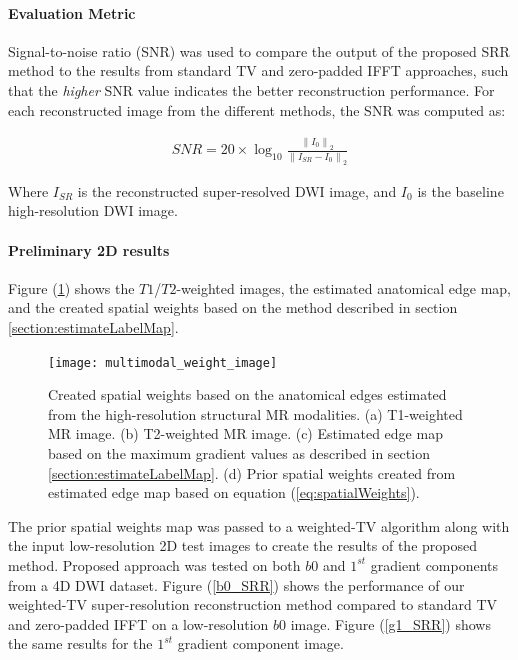 \paragraph{Evaluation Metric}

Signal-to-noise ratio (SNR) was used to compare the output of the proposed SRR method to the results from standard TV and zero-padded IFFT approaches, such that the \textit{higher} SNR value indicates the better reconstruction performance.
For each reconstructed image from the different methods, the SNR was computed as:

\begin{equation}
\label{eq:snr}
\begin{gathered}
SNR = 20\times \log_{10} \frac{\left \| I_0 \right \|_{2}}{\left \| I_{SR} - I_0 \right \|_{2}}
\end{gathered}
\end{equation}

Where $I_{SR}$ is the reconstructed super-resolved DWI image, and $I_0$ is the baseline high-resolution DWI image.

\paragraph{Preliminary 2D results}
Figure (\ref{multimodal_wight_image}) shows the $T1$/$T2$-weighted images, the estimated anatomical edge map, and the created spatial weights based on the method described in section \ref{section:estimateLabelMap}.

\begin{figure}
\centering
\texttt{[image: multimodal\_weight\_image]}\
\centering
\caption{Created spatial weights based on the anatomical edges estimated from the high-resolution structural MR modalities. (a) T1-weighted MR image. (b) T2-weighted MR image. (c) Estimated edge map based on the maximum gradient values as described in section \ref{section:estimateLabelMap}. (d) Prior spatial weights created from estimated edge map based on equation (\ref{eq:spatialWeights}).}
\label{multimodal_wight_image}
\end{figure}

The prior spatial weights map was passed to a weighted-TV algorithm along with the input low-resolution 2D test images to create the results of the proposed method.
Proposed approach was tested on both $b0$ and $1^{st}$ gradient components from a 4D DWI dataset.
Figure (\ref{b0_SRR}) shows the performance of our weighted-TV super-resolution reconstruction method compared to standard TV and zero-padded IFFT on a low-resolution $b0$ image.
Figure (\ref{g1_SRR}) shows the same results for the $1^{st}$ gradient component image.

